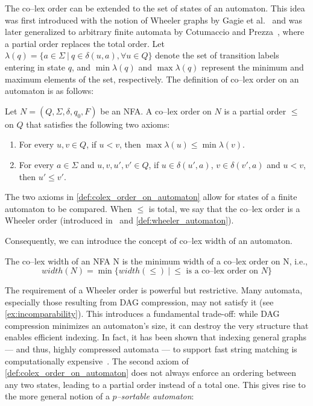 The co--lex order can be extended to the set of states of an automaton.
This idea was first introduced with the notion of Wheeler graphs by Gagie et al.~\cite{gagie2017wheeler} and was later generalized to arbitrary finite automata by Cotumaccio and Prezza~\cite{cotumaccio2021indexing}, where a partial order replaces the total order. 
%
Let $\lambda(q) = \{a\in\Sigma ~|~ q \in \delta(u, a), \forall u \in Q\}$ denote the set of transition labels entering in state $q$, and $\min\lambda(q)$ and $\max\lambda(q)$ represent the minimum and maximum elements of the set, respectively. The definition of co--lex order on an automaton is as follows:
\begin{definition}
    \label{def:colex_order_on_automaton}
    \sloppy
    Let $N = (Q, \Sigma, \delta, q_0, F)$ be an NFA. A co--lex order on $N$ is a partial order $\leq$ on $Q$ that satisfies the following two axioms:
    \begin{enumerate}
        \item For every $u, v \in Q$, if $u < v$, then $\max\lambda(u) \le \min\lambda(v)$.
        \item For every $a \in \Sigma$ and $u, v, u', v' \in Q$, if $u \in \delta(u', a)$, $v \in \delta(v', a)$ and $u < v$, then $u' \leq v'$.
    \end{enumerate}
\end{definition}

The two axioms in \cref{def:colex_order_on_automaton} allow for states of a finite automaton to be compared. When $\leq$ is total, we say that the co--lex order is a Wheeler order (introduced in~\cite{gagie2017wheeler} and \cref{def:wheeler_automaton}). 

Consequently, we can introduce the concept of co--lex width of an automaton.
\begin{definition}
    The co--lex width of an NFA N is the minimum width of a co--lex order on N, i.e.,
    $$
        width(N) = \min \{width(\leq)~|~\leq \text{ is a co--lex order on } N\}
    $$
\end{definition}

The requirement of a Wheeler order is powerful but restrictive. Many automata, especially those resulting from DAG compression, may not satisfy it (see \cref{ex:incomparability}). This introduces a fundamental trade-off: while DAG compression minimizes an automaton's size, it can destroy the very structure that enables efficient indexing. In fact, it has been shown that indexing general graphs — and thus, highly compressed automata — to support fast string matching is computationally expensive~\cite{equiGraphsCannotBe2023}. The second axiom of \cref{def:colex_order_on_automaton} does not always enforce an ordering between any two states, leading to a partial order instead of a total one. This gives rise to the more general notion of a \textit{$p$--sortable automaton}: 

